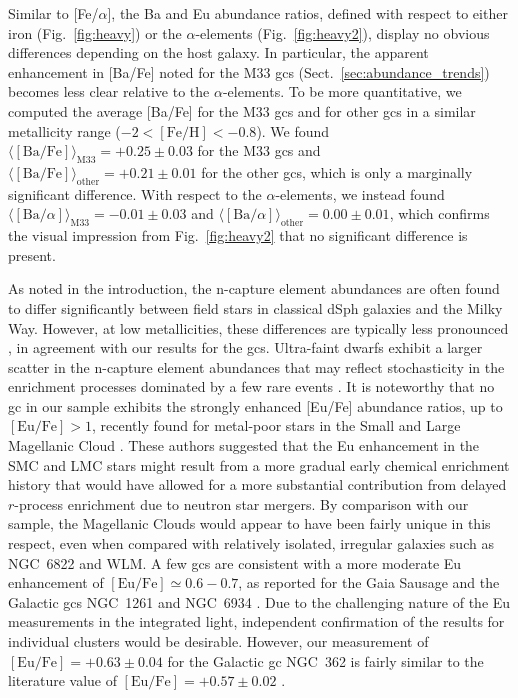 \documentclass{aa}
\begin{document}
Similar to [Fe/$\alpha$], the Ba and Eu abundance ratios, defined with respect to either iron (Fig.~\ref{fig:heavy}) or the $\alpha$-elements (Fig.~\ref{fig:heavy2}), display no obvious differences depending on the host galaxy. 
In particular, the apparent enhancement in [Ba/Fe] noted for the M33 \acp{gc} (Sect.~\ref{sec:abundance_trends}) becomes less clear relative to the $\alpha$-elements. To be more quantitative, we computed the average [Ba/Fe] for the M33 \acp{gc} and for other \acp{gc} in a similar metallicity range ($-2 < \mathrm{[Fe/H]} < -0.8$). We found $\langle \mathrm{[Ba/Fe]} \rangle_\mathrm{M33} = +0.25\pm0.03$ for the M33 \acp{gc} and $\langle \mathrm{[Ba/Fe]} \rangle_\mathrm{other} = +0.21\pm0.01$ for the other \acp{gc}, which is only a marginally significant difference. 
With respect to the $\alpha$-elements, we instead found $\langle [\mathrm{Ba}/\alpha] \rangle_\mathrm{M33} = -0.01\pm0.03$ and $\langle [\mathrm{Ba}/\alpha] \rangle_\mathrm{other} = 0.00\pm0.01$, which confirms the visual impression from Fig.~\ref{fig:heavy2} that no significant difference is present. 

As noted in the introduction, the n-capture element abundances are often found to differ significantly between field stars in classical dSph galaxies and the Milky Way. However, at low metallicities, these differences are typically less pronounced \citep{Reichert2020}, in agreement with our results for the \acp{gc}. Ultra-faint dwarfs  exhibit a larger scatter in the n-capture element abundances that may reflect stochasticity in the enrichment processes dominated by a few rare events \citep{Ji2016,Marshall2019,Molero2021}. 
It is noteworthy that no \ac{gc} in our sample exhibits the strongly enhanced [Eu/Fe] abundance ratios, up to $\mathrm{[Eu/Fe]}>1$, recently found for metal-poor stars in the Small and Large Magellanic Cloud
\citep[SMC and LMC;][]{Reggiani2021}. These authors suggested that the Eu enhancement in the SMC and LMC stars might result from a more gradual early chemical enrichment history that would have allowed for a more substantial contribution from delayed $r$-process enrichment due to neutron star mergers. By comparison with our sample, the Magellanic Clouds would appear to have been fairly unique in this respect, even when compared with relatively isolated, irregular galaxies such as NGC~6822 and WLM. 
A few \acp{gc} are consistent with a more moderate Eu enhancement of $\mathrm{[Eu/Fe]}\simeq0.6-0.7$, as reported for the Gaia Sausage \citep{Aguado2021} and the Galactic \acp{gc} NGC~1261 and NGC~6934 \citep{Koch-Hansen2021,Marino2021}. Due to the challenging nature of the Eu measurements in the integrated light, independent confirmation of the results for individual clusters would be desirable. However, our measurement of $\mathrm{[Eu/Fe]}=+0.63\pm0.04$ for the Galactic \ac{gc} NGC~362 is fairly similar to the literature value of $\mathrm{[Eu/Fe]}=+0.57\pm0.02$ \citep{Shetrone2000,Pritzl2005}.
\end{document}
